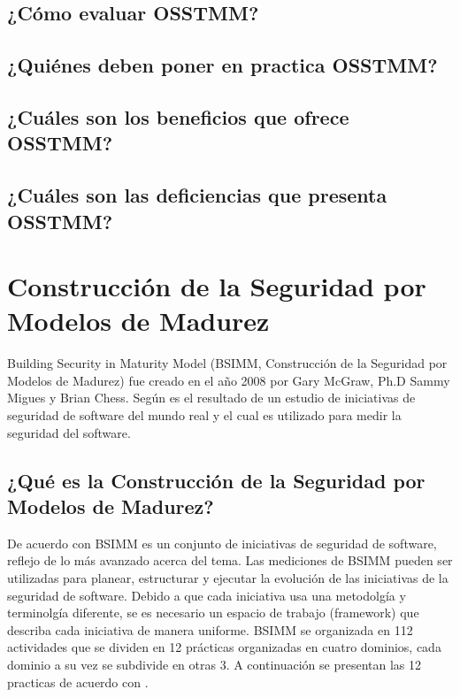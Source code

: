 \documentclass[runningheads,a4paper]{llncs}
\begin{document}
\subsection{¿Cómo evaluar \gls{OSSTMM}?}

\subsection{¿Quiénes deben poner en practica \gls{OSSTMM}?}

\subsection{¿Cuáles son los beneficios que ofrece \gls{OSSTMM}?}

\subsection{¿Cuáles son las deficiencias que presenta \gls{OSSTMM}?}


\section{Construcción de la Seguridad por Modelos de Madurez}
Building  Security in Maturity Model (BSIMM, Construcción de la Seguridad por Modelos de Madurez) fue creado en el año 2008 por Gary McGraw, Ph.D Sammy Migues y Brian Chess. Según \cite{BSIMM_a} es el resultado de un estudio de iniciativas de seguridad de software del mundo real y el cual es utilizado para medir la seguridad del software. 

\subsection{¿Qué es la Construcción de la Seguridad por Modelos de Madurez?}
De acuerdo con \cite{BSIMM_a} \gls{BSIMM} es un conjunto de iniciativas de seguridad de software, reflejo de lo más avanzado acerca del tema. Las mediciones de \gls{BSIMM} pueden ser utilizadas para planear, estructurar y ejecutar la evolución de las iniciativas de la seguridad de software. Debido a que cada iniciativa usa una metodolgía y terminolgía diferente, se es necesario un espacio de trabajo (framework) que describa cada iniciativa de manera uniforme. \gls{BSIMM} se organizada en 112 actividades que se dividen en 12 prácticas organizadas en cuatro dominios, cada dominio a su vez se subdivide en otras 3. A continuación se presentan las 12 practicas de acuerdo con \cite{BSIMM_a}.
\end{document}
